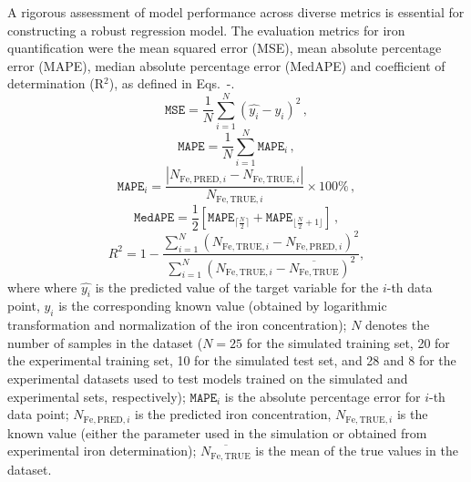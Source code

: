 \documentclass[10pt]{iopart}
\begin{document}
A rigorous assessment of model performance across diverse metrics is essential for constructing a robust regression model. 
The evaluation metrics for iron quantification were the mean squared error (MSE), 
mean absolute percentage error (MAPE), 
median absolute percentage error (MedAPE) and 
coefficient of determination (R$^2$), as defined in Eqs.~-.
\begin{equation}\label{eqMSE}
  \mathtt{MSE} = \frac{1}{N}\sum_{i=1}^{N} (\hat{y_i}-y_i)^2\,,
\end{equation}
\begin{equation}\label{eqMAPE}
  \mathtt{MAPE} = \frac{1}{N}\sum_{i=1}^{N} \mathtt{MAPE}_i\,,
\end{equation}
\begin{equation}\label{eqMAPEi}
  \mathtt{MAPE}_i = \frac{|N_{\mathrm{Fe,PRED},i}-N_{\mathrm{Fe,TRUE},i}|}{N_{\mathrm{Fe,TRUE},i}}\times 100 \%\,,
\end{equation}
\begin{equation}\label{eqMedAPE}
  \mathtt{MedAPE} = \frac{1}{2} \left[\mathtt{MAPE}_{\lceil\frac{N}{2}\rceil}+\mathtt{MAPE}_{\lfloor\frac{N}{2}+1\rfloor}\right]\,,
\end{equation}
\begin{equation}\label{eqR2}
  R^2 = 1-\frac{\displaystyle\sum_{i=1}^{N} (N_{\mathrm{Fe,TRUE},i}-N_{\mathrm{Fe,PRED},i})^2}{\displaystyle\sum_{i=1}^{N} (N_{\mathrm{Fe,TRUE},i}-\overline{{N_\mathrm{Fe,TRUE}}})^2},
\end{equation}
where 
where $\hat{y_i}$ is the predicted value of the target variable for the $i$-th data point, 
$y_i$ is the corresponding known value (obtained by logarithmic transformation and normalization of the iron concentration);
$N$ denotes the number of samples in the dataset 
($N = 25$ for the simulated training set, 20 for the experimental training set, 
10 for the simulated test set, 
and 28 and 8 for the experimental datasets used to test models trained on the simulated and experimental sets, respectively);
$\mathtt{MAPE}_i$ is the  absolute percentage error for $i$-th data point;
$N_{\mathrm{Fe,PRED},i}$ is the predicted iron concentration, 
$N_{\mathrm{Fe,TRUE},i}$ is the known value 
(either the parameter used in the simulation or obtained from experimental iron determination); 
$\overline{N_\mathrm{Fe,TRUE}}$ is the mean of the true values in the dataset.
\end{document}

